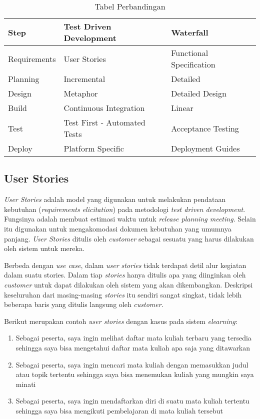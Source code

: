 \begin{spacing}{2}
    \renewcommand{\arraystretch}{2}
    \begin{table}[]
    \centering
    \begin{tabular}{|l|l|l|}
    \hline
    \textbf{Step} & \textbf{Test Driven Development} & \textbf{Waterfall}       \\ \hline
    Requirements  & User Stories                     & Functional Specification \\ \hline
    Planning      & Incremental                      & Detailed                 \\ \hline
    Design        & Metaphor                         & Detailed Design          \\ \hline
    Build         & Continuous Integration           & Linear                   \\ \hline
    Test          & Test First - Automated Tests     & Acceptance Testing       \\ \hline
    Deploy        & Platform Specific                & Deployment Guides        \\ \hline
    \end{tabular}
    \caption{Tabel Perbandingan}
    \label{my-label}
    \end{table}

  \subsection{User Stories}
    \emph{User Stories} adalah model yang digunakan untuk melakukan pendataan kebutuhan (\emph{requirements elicitation}) pada metodologi \emph{test driven development}. Fungsinya adalah membuat estimasi waktu untuk \emph{release planning meeting}. Selain itu digunakan untuk mengakomodasi dokumen kebutuhan yang umumnya panjang. \emph{User Stories} ditulis oleh \emph{customer} sebagai sesuatu yang harus dilakukan oleh sistem untuk mereka.

    Berbeda dengan \emph{use case}, dalam \emph{user stories} tidak terdapat detil alur kegiatan dalam suatu stories. Dalam tiap \emph{stories} hanya ditulis apa yang diinginkan oleh \emph{customer} untuk dapat dilakukan oleh sistem yang akan dikembangkan. Deskripsi keseluruhan dari masing-masing \emph{stories} itu sendiri sangat singkat, tidak lebih beberapa baris yang ditulis langsung oleh \emph{customer}.

    Berikut merupakan contoh \emph{user stories} dengan kasus pada sistem \emph{elearning}:
    \begin{enumerate}
      \item Sebagai peserta, saya ingin melihat daftar mata kuliah terbaru yang tersedia sehingga saya bisa mengetahui daftar mata kuliah apa saja yang ditawarkan
      \item Sebagai peserta, saya ingin mencari mata kuliah dengan memasukkan judul atau topik tertentu sehingga saya bisa menemukan kuliah yang mungkin saya minati
      \item Sebagai peserta, saya ingin mendaftarkan diri di suatu mata kuliah tertentu sehingga saya bisa mengikuti pembelajaran di mata kuliah tersebut
    \end{enumerate}


\end{spacing}
